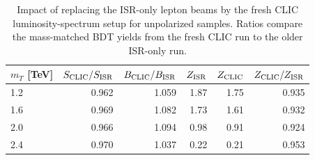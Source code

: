 \begin{table}[t]
\centering
\caption{Impact of replacing the ISR-only lepton beams by the fresh CLIC
luminosity-spectrum setup for unpolarized samples.  Ratios compare the
mass-matched BDT yields from the fresh CLIC run to the older ISR-only run.}
\label{tab:fresh-clic-vs-isr}
\small
\begin{tabular}{lrrrrr}
\toprule
$m_T$ [TeV] & $S_{\rm CLIC}/S_{\rm ISR}$ & $B_{\rm CLIC}/B_{\rm ISR}$
& $Z_{\rm ISR}$ & $Z_{\rm CLIC}$ & $Z_{\rm CLIC}/Z_{\rm ISR}$ \\
\midrule
    1.2 & 0.962 & 1.059 & 1.87 & 1.75 & 0.935 \\
    1.6 & 0.969 & 1.082 & 1.73 & 1.61 & 0.932 \\
    2.0 & 0.966 & 1.094 & 0.98 & 0.91 & 0.924 \\
    2.4 & 0.970 & 1.037 & 0.22 & 0.21 & 0.953 \\
\bottomrule
\end{tabular}
\end{table}
